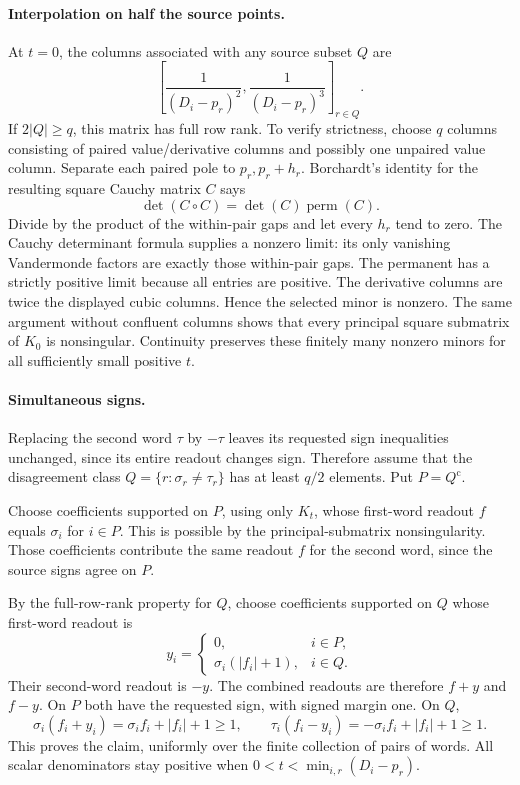 \paragraph{Interpolation on half the source points.}
At $t=0$, the columns associated with any source subset $Q$ are
\[
 \left[\frac1{(D_i-p_r)^2},\frac1{(D_i-p_r)^3}\right]_{r\in Q}.
\]
If $2|Q|\geq q$, this matrix has full row rank.  To verify strictness,
choose $q$ columns consisting of paired value/derivative columns and
possibly one unpaired value column.  Separate each paired pole to
$p_r,p_r+h_r$.  Borchardt's identity for the resulting square Cauchy
matrix $C$ says
\[
 \det(C\mathbin{\circ}C)=\det(C)\operatorname{perm}(C).
\]
Divide by the product of the within-pair gaps and let every $h_r$ tend
to zero.  The Cauchy determinant formula supplies a nonzero limit:
its only vanishing Vandermonde factors are exactly those within-pair
gaps.  The permanent has a strictly positive limit because all entries
are positive.  The derivative columns are twice the displayed cubic
columns.  Hence the selected minor is nonzero.  The same argument
without confluent columns shows that every principal square submatrix
of $K_0$ is nonsingular.  Continuity preserves these finitely many
nonzero minors for all sufficiently small positive $t$.

\paragraph{Simultaneous signs.}
Replacing the second word $\tau$ by $-\tau$ leaves its requested sign
inequalities unchanged, since its entire readout changes sign.
Therefore assume that the disagreement class
$Q=\{r:\sigma_r\neq\tau_r\}$ has at least $q/2$ elements.
Put $P=Q^{\mathrm c}$.

Choose coefficients supported on $P$, using only $K_t$, whose first-word
readout $f$ equals $\sigma_i$ for $i\in P$.  This is possible by the
principal-submatrix nonsingularity.  Those coefficients contribute the
same readout $f$ for the second word, since the source signs agree on
$P$.

By the full-row-rank property for $Q$, choose coefficients supported on
$Q$ whose first-word readout is
\[
 y_i=\begin{cases}
 0,&i\in P,\\
 \sigma_i(|f_i|+1),&i\in Q.
 \end{cases}
\]
Their second-word readout is $-y$.  The combined readouts are therefore
$f+y$ and $f-y$.  On $P$ both have the requested sign, with signed
margin one.  On $Q$,
\[
 \sigma_i(f_i+y_i)=\sigma_i f_i+|f_i|+1\geq1,\qquad
 \tau_i(f_i-y_i)=-\sigma_i f_i+|f_i|+1\geq1.
\]
This proves the claim, uniformly over the finite collection of pairs of
words.  All scalar denominators stay positive when
$0<t<\min_{i,r}(D_i-p_r)$.

